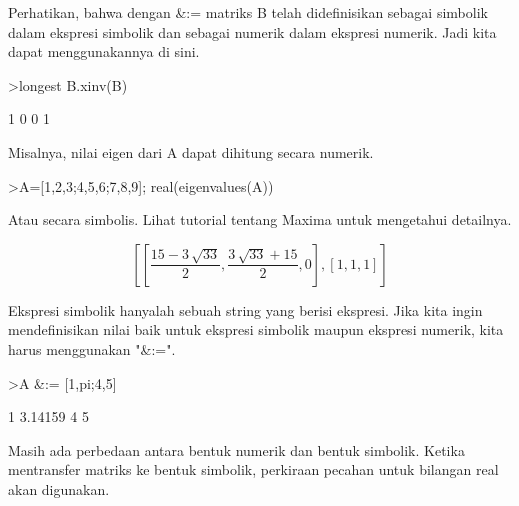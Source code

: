 \documentclass[a4paper,10pt]{article}
\begin{document}
\begin{eulernotebook}
\begin{eulercomment}
Perhatikan, bahwa dengan \&:= matriks B telah didefinisikan sebagai
simbolik dalam ekspresi simbolik dan sebagai numerik dalam ekspresi
numerik. Jadi kita dapat menggunakannya di sini.
\end{eulercomment}
\begin{eulerprompt}
>longest B.xinv(B)
\end{eulerprompt}
\begin{euleroutput}
                        1                       0 
                        0                       1 
\end{euleroutput}
\begin{eulercomment}
Misalnya, nilai eigen dari A dapat dihitung secara numerik.
\end{eulercomment}
\begin{eulerprompt}
>A=[1,2,3;4,5,6;7,8,9]; real(eigenvalues(A))
\end{eulerprompt}
\begin{euleroutput}
  [16.1168,  -1.11684,  0]
\end{euleroutput}
\begin{eulercomment}
Atau secara simbolis. Lihat tutorial tentang Maxima untuk mengetahui
detailnya.
\end{eulercomment}
\begin{eulerformula}
\[
\left[ \left[ \frac{15-3\,\sqrt{33}}{2} , \frac{3\,\sqrt{33}+15}{2}   , 0 \right]  , \left[ 1 , 1 , 1 \right]  \right] 
\]
\end{eulerformula}
\begin{eulercomment}
Ekspresi simbolik hanyalah sebuah string yang berisi ekspresi. Jika
kita ingin mendefinisikan nilai baik untuk ekspresi simbolik maupun
ekspresi numerik, kita harus menggunakan "\&:=".
\end{eulercomment}
\begin{eulerprompt}
>A &:= [1,pi;4,5]
\end{eulerprompt}
\begin{euleroutput}
              1       3.14159 
              4             5 
\end{euleroutput}
\begin{eulercomment}
Masih ada perbedaan antara bentuk numerik dan bentuk simbolik. Ketika
mentransfer matriks ke bentuk simbolik, perkiraan pecahan untuk
bilangan real akan digunakan.
\end{eulercomment}

\end{eulernotebook}
\end{document}

